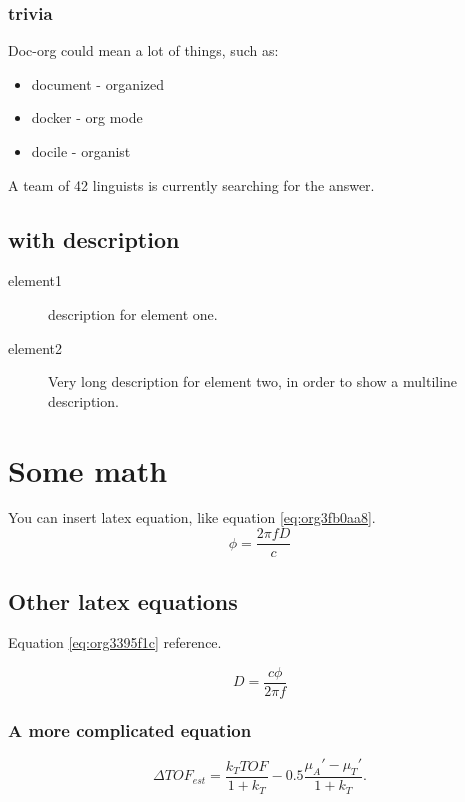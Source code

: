 \documentclass[11pt]{article}
\begin{document}
\subsubsection{trivia}
\label{sec:org3f625c3}
Doc-org could mean a lot of things, such as:
\begin{itemize}
\item document - organized
\item docker - org mode
\item docile - organist
\end{itemize}
A team of 42 linguists is currently searching for the answer.
\subsection{with description}
\label{sec:org116d9dd}
\begin{description}
\item[{element1}] description for element one.
\item[{element2}] Very long description for element two, in order to show a
multiline description.
\end{description}

\section{Some math}
\label{sec:org7f870e2}
You can insert latex equation, like equation \ref{eq:org3fb0aa8}.
\begin{equation}
\label{eq:org3fb0aa8}
\phi = \frac{2\pi fD}{c}
\end{equation}
\subsection{Other latex equations}
\label{sec:org7abe4ac}
Equation \ref{eq:org3395f1c} reference.

\begin{equation}
\label{eq:org3395f1c}
D = \frac{c\phi}{2\pi f}
\end{equation}

\subsubsection{A more complicated equation}
\label{sec:org91b21d9}

\begin{equation}
\Delta TOF_{est} = \frac{k_T TOF}{1+k_T } - 0.5 \frac{\mu_A' - \mu_T'}{1+k_T}.
\end{equation}
\end{document}
